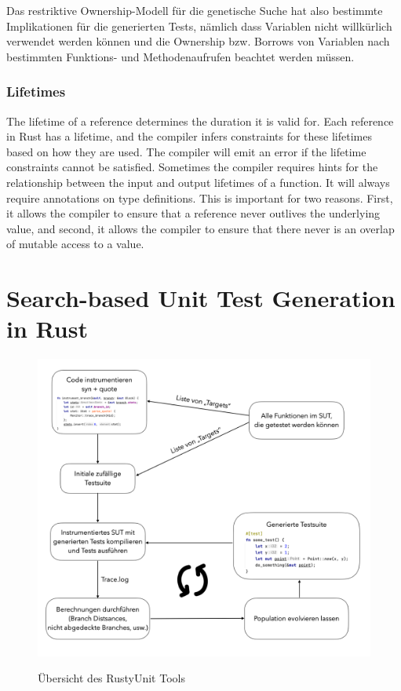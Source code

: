 \documentclass{article}
\begin{document}
Das restriktive Ownership-Modell für die genetische Suche hat also bestimmte Implikationen für die generierten Tests, nämlich dass Variablen nicht willkürlich verwendet werden können und die Ownership bzw. Borrows von Variablen nach bestimmten Funktions- und Methodenaufrufen beachtet werden müssen.

\subsubsection{Lifetimes}
The lifetime of a reference determines the duration it is valid for. Each reference in Rust has a lifetime, and the compiler infers constraints for these lifetimes based on how they are used. The compiler will emit an error if the lifetime constraints cannot be satisfied. Sometimes the compiler requires hints for the relationship between the input and output lifetimes of a function. It will always require annotations on type definitions. This is important for two reasons. First, it allows the compiler to ensure that a reference never outlives the underlying value, and second, it allows the compiler to ensure that there never is an overlap of mutable access to a value.

\section{Search-based Unit Test Generation in Rust}
\begin{figure}[h]
\caption{Übersicht des RustyUnit Tools}
\centering
\includegraphics[width=\textwidth]{testify-overview}
\label{fig:testify-overview}
\end{figure}
\end{document}

